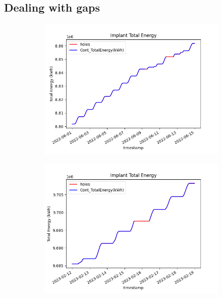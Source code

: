 \subsection{Dealing with gaps}

\begin{figure}[H]
	\centering
	\begin{subfigure}[t]{0.48\textwidth}
		\centering
		\includegraphics[width=\textwidth, keepaspectratio]{chapters/2_data_preprocessing/imgs/totenergybuco1.png}
	\end{subfigure}
	\hspace{0.1cm}
	\begin{subfigure}[t]{0.48\textwidth}
		\centering
		\includegraphics[width=\textwidth, keepaspectratio]{chapters/2_data_preprocessing/imgs/totenergybuco2.png}
	\end{subfigure}\\


\end{figure}
